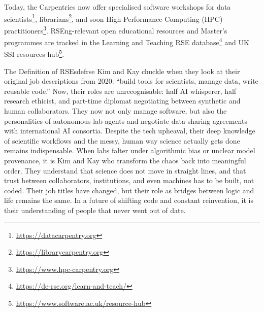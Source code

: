 \documentclass{eceasst}
\begin{document}
Today, the Carpentries now offer specialised software workshops
for data scientists\footnote{\url{https://datacarpentry.org}},
librarians\footnote{\url{https://librarycarpentry.org}},
and soon High-Performance Computing (HPC) practitioners\footnote{\url{https://www.hpc-carpentry.org}}.
RSEng-relevant open educational resources and Master's programmes are tracked
in the Learning and Teaching RSE database\footnote{\url{https://de-rse.org/learn-and-teach/}}
and UK SSI resources hub\footnote{\url{https://www.software.ac.uk/resource-hub}}.


\begin{story}{The Definition of RSEs}{defrse}
Kim and Kay chuckle when they look at their original job descriptions from 2020: ``build tools for scientists, manage data, write reusable code.''
Now, their roles are unrecognisable: half AI whisperer, half research ethicist, and part-time diplomat negotiating between synthetic and human collaborators.
They now not only manage software, but also the personalities of autonomous lab agents and negotiate data-sharing agreements with international AI consortia.
Despite the tech upheaval, their deep knowledge of scientific workflows and the messy, human way science actually gets done remains indispensable.
When labs falter under algorithmic bias or unclear model provenance, it is Kim and Kay who transform the chaos back into meaningful order.
They understand that science does not move in straight lines, and that trust between collaborators, institutions, and even machines has to be built, not coded.
Their job titles have changed, but their role as bridges between logic and life remains the same.
In a future of shifting code and constant reinvention, it is their understanding of people that never went out of date.

\end{story}
\end{document}
